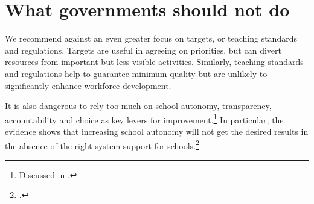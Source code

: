 \section{What governments should not do}\label{sec:governments-not-do}

We recommend against an even greater focus on targets, or teaching standards and regulations. 
Targets are useful in agreeing on priorities, but can divert resources from important but less visible activities. Similarly, teaching standards and regulations help to guarantee minimum quality but are unlikely to significantly enhance workforce development.

It is also dangerous to rely too much on school autonomy, transparency, accountability and choice as key levers for improvement.\footnote{Discussed in \textcite{Jensen2013Themythsofmarkets}.}
In particular, the evidence shows that increasing school autonomy will not get the desired results in the absence of the right system support for schools.\footcite{Suggett2015SchoolautonomyNecessarybutnotsufficient}

